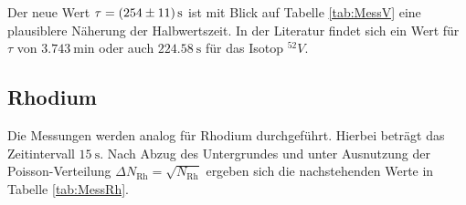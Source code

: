 Der neue Wert $\tau = \SI{254\pm11}{\second}$ ist mit Blick auf Tabelle \ref{tab:MessV} eine plausiblere Näherung der Halbwertszeit.
In der Literatur\cite{perTable} findet sich ein Wert für $\tau$ von $\SI{3.743}{\minute}$ oder auch $\SI{224.58}{\second}$ für das Isotop $^{52}V$.

\subsection{Rhodium}

Die Messungen werden analog für Rhodium durchgeführt. Hierbei beträgt das Zeitintervall $\SI{15}{\second}$.
Nach Abzug des Untergrundes und unter Ausnutzung der Poisson-Verteilung $\Delta N_\text{Rh}=\sqrt{N_\text{Rh}}$ ergeben sich die nachstehenden Werte in Tabelle \ref{tab:MessRh}.

